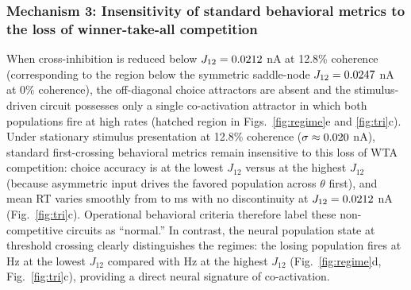 \documentclass[11pt]{article}
\begin{document}
	\subsubsection{Mechanism 3: Insensitivity of standard behavioral metrics to the loss of winner-take-all competition}
	When cross-inhibition is reduced below $J_{12}=0.0212$ nA at 12.8\% coherence (corresponding to the region below the symmetric saddle-node $J_{12}=0.0247$ nA at 0\% coherence), the off-diagonal choice attractors are absent and the stimulus-driven circuit possesses only a single co-activation attractor in which both populations fire at high rates (hatched region in Figs.~\ref{fig:regime}e and \ref{fig:tri}c). Under stationary stimulus presentation at 12.8\% coherence ($\sigma\approx0.020$ nA), standard first-crossing behavioral metrics remain insensitive to this loss of WTA competition: choice accuracy is \coactAccLow{} at the lowest $J_{12}$ versus \coactAccHigh{} at the highest $J_{12}$ (because asymmetric input drives the favored population across $\theta$ first), and mean RT varies smoothly from \coactRtLow{} to \coactRtHigh{} ms with no discontinuity at $J_{12}=0.0212$ nA (Fig.~\ref{fig:tri}c). Operational behavioral criteria therefore label these non-competitive circuits as ``normal.'' In contrast, the neural population state at threshold crossing clearly distinguishes the regimes: the losing population fires at \coactLoserLow{} Hz at the lowest $J_{12}$ compared with \coactLoserHigh{} Hz at the highest $J_{12}$ (Fig.~\ref{fig:regime}d, Fig.~\ref{fig:tri}c), providing a direct neural signature of co-activation.
	
\end{document}
